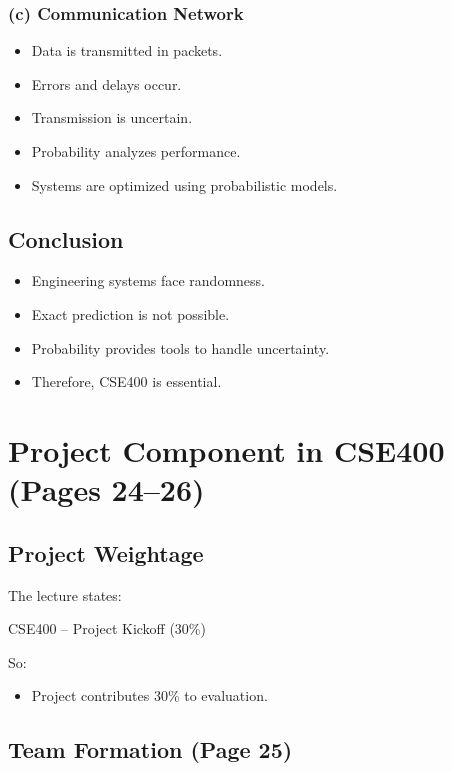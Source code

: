 \documentclass[12pt]{article}
\begin{document}
\subsubsection{(c) Communication Network}

\begin{itemize}
\item Data is transmitted in packets.
\item Errors and delays occur.
\item Transmission is uncertain.
\item Probability analyzes performance.
\item Systems are optimized using probabilistic models.
\end{itemize}

\subsection{Conclusion}

\begin{itemize}
\item Engineering systems face randomness.
\item Exact prediction is not possible.
\item Probability provides tools to handle uncertainty.
\item Therefore, CSE400 is essential.
\end{itemize}

\section{Project Component in CSE400 (Pages 24--26)}

\subsection{Project Weightage}

The lecture states:

\begin{center}
CSE400 -- Project Kickoff (30\%)
\end{center}

So:

\begin{itemize}
\item Project contributes 30\% to evaluation.
\end{itemize}

\subsection{Team Formation (Page 25)}
\end{document}
